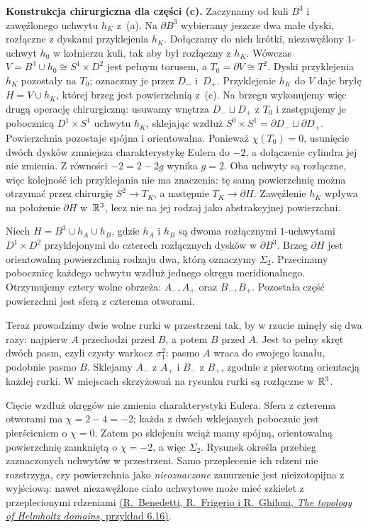 \smallskip
\noindent\textbf{Konstrukcja chirurgiczna dla części (c).}
Zaczynamy od kuli $B^3$ i zawęźlonego uchwytu $h_K$ z~(a).
Na $\partial B^3$ wybieramy jeszcze dwa małe dyski,
rozłączne z dyskami przyklejenia $h_K$. Dołączamy do nich
krótki, niezawęźlony $1$-uchwyt $h_0$ w kołnierzu kuli,
tak aby był rozłączny z $h_K$. Wówczas
$V=B^3\cup h_0\cong S^1\times D^2$ jest pełnym torusem,
a $T_0=\partial V\cong T^2$. Dyski przyklejenia $h_K$
pozostały na $T_0$; oznaczmy je przez $D_-$ i~$D_+$.
Przyklejenie $h_K$ do $V$ daje bryłę $H=V\cup h_K$,
której brzeg jest powierzchnią z~(c). Na brzegu wykonujemy
więc drugą operację chirurgiczną: usuwamy wnętrza
$D_-\sqcup D_+$ z $T_0$ i zastępujemy je pobocznicą
$D^1\times S^1$ uchwytu $h_K$, sklejając wzdłuż
$S^0\times S^1=\partial D_-\sqcup\partial D_+$.
Powierzchnia pozostaje spójna i orientowalna. Ponieważ
$\chi(T_0)=0$, usunięcie dwóch dysków zmniejsza
charakterystykę Eulera do $-2$, a dołączenie cylindra jej
nie zmienia. Z równości $-2=2-2g$ wynika $g=2$.
Oba uchwyty są rozłączne, więc kolejność ich przyklejania
nie ma znaczenia: tę samą powierzchnię można otrzymać
przez chirurgię $S^2\to T_K$, a następnie $T_K\to\partial H$.
Zawęźlenie $h_K$ wpływa na położenie $\partial H$ w~$\mathbb{R}^3$,
lecz nie na jej rodzaj jako abstrakcyjnej powierzchni.

\begin{przyklad}
\label{prz:przeplatanie-dwoch-uchwytow-21}
Niech $H=B^3\cup h_A\cup h_B$, gdzie $h_A$ i $h_B$ są
dwoma rozłącznymi $1$-uchwytami $D^1\times D^2$ przyklejonymi
do czterech rozłącznych dysków w $\partial B^3$.
Brzeg $\partial H$ jest orientowalną powierzchnią rodzaju dwa,
którą oznaczymy $\Sigma_2$. Przecinamy pobocznicę każdego
uchwytu wzdłuż jednego okręgu meridionalnego.
Otrzymujemy cztery wolne obrzeża: $A_-,A_+$ oraz $B_-,B_+$.
Pozostała część powierzchni jest sferą z czterema otworami.

Teraz prowadzimy dwie wolne rurki w przestrzeni tak, by w rzucie
minęły się dwa razy: najpierw $A$ przechodzi przed $B$,
a potem $B$ przed $A$.
Jest to pełny skręt dwóch pasm, czyli czysty warkocz
$\sigma_1^2$: pasmo $A$ wraca do swojego kanału, podobnie
pasmo $B$. Sklejamy $A_-$ z $A_+$ i $B_-$ z $B_+$,
zgodnie z pierwotną orientacją każdej rurki. W miejscach
skrzyżowań na rysunku rurki są rozłączne w $\mathbb{R}^3$.

Cięcie wzdłuż okręgów nie zmienia charakterystyki Eulera.
Sfera z czterema otworami ma $\chi=2-4=-2$;
każda z dwóch wklejanych pobocznic jest pierścieniem
o $\chi=0$. Zatem po sklejeniu wciąż mamy spójną,
orientowalną powierzchnię zamkniętą o $\chi=-2$,
a więc $\Sigma_2$. Rysunek określa przebieg zaznaczonych
uchwytów w przestrzeni. Samo przeplecenie ich rdzeni nie
rozstrzyga, czy powierzchnia jako \emph{nieoznaczone}
zanurzenie jest nieizotopijna z wyjściową: nawet
niezawęźlone ciało uchwytowe może mieć szkielet z
przeplecionymi rdzeniami
\href{https://people.dm.unipi.it/benedett/Expositiones_online.pdf}
{(R.~Benedetti, R.~Frigerio i R.~Ghiloni,
\emph{The topology of Helmholtz domains}, przykład 6.16)}.
\end{przyklad}

